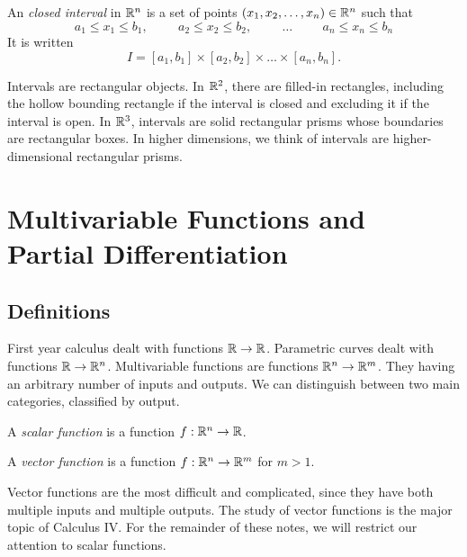 \documentclass[fleqn,letterpaper]{report}
\begin{document}
\begin{defn}
An \emph{closed interval} in $\mathbb{R}^n$ is a set of points $(x_1,
x_2, \ldots, x_n) \in \mathbb{R}^n$ such that 
\begin{equation*}
a_1 \leq x_1 \leq b_1, \hspace{1cm} 
a_2 \leq x_2 \leq b_2, \hspace{1cm} \ldots \hspace{1cm} 
a_n \leq x_n \leq b_n 
\end{equation*}
It is written 
\begin{equation*}
I = [a_1,b_1]\times [a_2,b_2] \times \ldots \times [a_n,b_n].
\end{equation*}
\end{defn}

Intervals are rectangular objects. In $\mathbb{R}^2$, there are
filled-in rectangles, including the hollow bounding rectangle
if the interval is closed and excluding it if the interval is
open. In $\mathbb{R}^3$, intervals are solid rectangular prisms
whose boundaries are rectangular boxes. In higher dimensions,
we think of intervals are higher-dimensional rectangular
prisms.

\chapter{Multivariable Functions and Partial Differentiation}
\label{multivariable-functions}

\section{Definitions}
\label{multivariable-functions-definitions}

First year calculus dealt with functions $\mathbb{R}
\rightarrow \mathbb{R}$. Parametric curves dealt with functions
$\mathbb{R} \rightarrow \mathbb{R}^n$. Multivariable functions are
functions $\mathbb{R}^n \rightarrow \mathbb{R}^m$. They having an arbitrary number
of inputs and outputs. We can distinguish between two main
categories, classified by output.

\begin{defn}
A \emph{scalar function} is a function $f: \mathbb{R}^n \rightarrow
\mathbb{R}$.
\end{defn}

\begin{defn}
A \emph{vector function} is a function $f: \mathbb{R}^n \rightarrow
\mathbb{R}^m$ for $m > 1$.
\end{defn}

Vector functions are the most difficult and complicated, since
they have both multiple inputs and multiple outputs. The study
of vector functions is the major topic of Calculus IV. For the
remainder of these notes, we will restrict our attention to
scalar functions.
\end{document}
